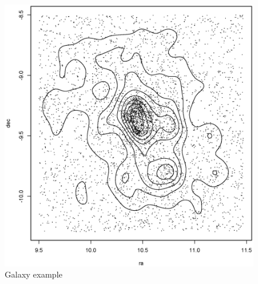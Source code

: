 \documentclass[11pt]{book}\usepackage[]{graphicx}\usepackage[]{color}
\makeatletter
\def\maxwidth{ %
  \ifdim\Gin@nat@width>\linewidth
    \linewidth
  \else
    \Gin@nat@width
  \fi
}
\newenvironment{knitrout}{}{} %
\makeatother
\begin{document}
\begin{figure}[H]
\begin{center}
\begin{knitrout}
\color{fgcolor}
\includegraphics[width=\maxwidth]{knitr-cache/unnamed-chunk-6-1} 

\end{knitrout}
\end{center}
\caption{Galaxy example}
\label{fig:example-galaxy}
\end{figure}

\clearpage

\appendix

\renewcommand{\thesection}{\thechapter.\arabic{section}}
\renewcommand{\thetable}{\thechapter.\arabic{table}}
\renewcommand{\thefigure}{\thechapter.\arabic{figure}}
\renewcommand{\theequation}{\thechapter.\arabic{equation}}
\end{document}
